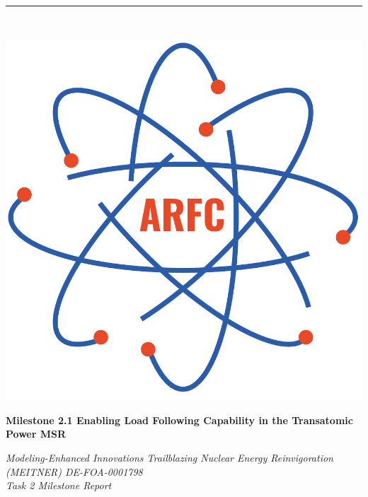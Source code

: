 \documentclass[12pt]{article} %
\begin{document}

\begin{titlepage} %
    \newcommand{\HRule}{\rule{\linewidth}{0.5mm}} %
    
    \center %

    
    \HRule\\[0.2cm]
    
     \begin{minipage}{0.4\textwidth}
        \includegraphics[width=\textwidth]{arfc-logo}
        \end{minipage}%
        \begin{minipage}{0.6\textwidth}
        {\begin{flushright}\huge\bfseries Milestone 2.1  Enabling Load Following Capability in the Transatomic Power MSR \end{flushright}}
        {\begin{flushright}\large\textit{Modeling-Enhanced Innovations Trailblazing Nuclear Energy Reinvigoration (MEITNER) DE-FOA-0001798 \\ Task 2 Milestone Report}\end{flushright}}


\end{minipage}
\end{titlepage}
\end{document}
